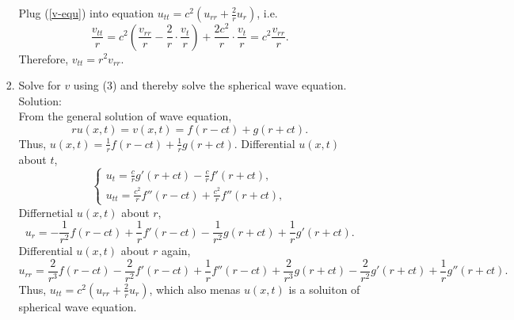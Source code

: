 \documentclass[12pt]{article}%
\begin{document}
\begin{enumerate}
\begin{enumerate}
\begin{enumerate}
\begin{equation}
            \end{equation}
            Plug (\ref*{v-equ}) into equation $u_{tt} = c^2\left(u_{rr} + \frac{2}{r}u_r\right)$, i.e.
            \[ \frac{v_{tt}}{r}=c^2(\frac{v_{rr}}{r}-\frac{2}{r}\cdot\frac{v_{t}}{r})+\frac{2c^2}{r}\cdot\frac{v_{t}}{r}=c^2\frac{v_{rr}}{r}.\]
            Therefore, $v_{tt}=r^2v_{rr}$.
            \item Solve for $v$ using (3) and thereby solve the spherical wave equation. \smallskip \\
            Solution:\\
            From the general solution of wave equation, 
            \[ru(x,t)=v(x,t)=f(r-ct)+g(r+ct). \]
            Thus, $u(x,t)= \frac{1}{r}f(r-ct)+\frac{1}{r}g(r+ct). $
            Differential $u(x,t)$ about $t$,
            \begin{equation*}
                \begin{cases}
                    u_{t}=\frac{c}{r}g'(r+ct)-\frac{c}{r}f'(r+ct),
                    \\
                    u_{tt}=\frac{c^2}{r}f''(r-ct)+\frac{c^2}{r}f''(r+ct),  
                \end{cases}
            \end{equation*}
            Differnetial $u(x,t)$ about $r$,
            \[ u_{r}=-\frac{1}{r^2}f(r-ct)+\frac{1}{r}f'(r-ct)-\frac{1}{r^2}g(r+ct)+\frac{1}{r}g'(r+ct).\]
        Differential $u(x,t)$ about $r$ again,
            \[u_{rr}=\frac{2}{r^3}f(r-ct)-\frac{2}{r^2}f'(r-ct)+\frac{1}{r}f''(r-ct)
        +\frac{2}{r^3}g(r+ct)-\frac{2}{r^2}g'(r+ct)+\frac{1}{r}g''(r+ct).\]
         Thus, $u_{tt} = c^2\left(u_{rr} + \frac{2}{r}u_r\right)$, which also menas $u(x,t)$ is a soluiton of spherical wave equation. 
           

\end{enumerate}
\end{enumerate}
\end{enumerate}
\end{document}
